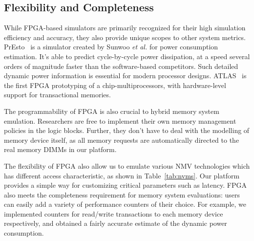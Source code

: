 \documentclass[conference]{IEEEtran}
\begin{document}
\subsection{Flexibility and Completeness}
While FPGA-based simulators are primarily recognized for their high
simulation efficiency and accuracy, they also provide unique scopes to
other system metrics.  PrEsto~\cite{Sunwoo:PrEsto} is a simulator
created by Sunwoo \emph{et al.} for power consumption estimation. It's
able to predict cycle-by-cycle power dissipation, at a speed several
orders of magnitude faster than the software-based competitors. Such
detailed dynamic power information is essential for modern processor
designs.  ATLAS~\cite{Njoroge:ATLAS} is the first FPGA prototyping of
a chip-multiprocessors, with hardware-level support for transactional
memories.

The programmability of FPGA is also crucial to hybrid memory system
emulation. Researchers are free to implement their own memory
management policies in the logic blocks. Further, they don't have to
deal with the modelling of memory device itself, as all memory
requests are automatically directed to the real memory DIMMs in our
platform.

The flexibility of FPGA also allow us to emulate various NMV
technologies which has different access characteristic, as shown in
Table~\ref{tab:nvms}. Our platform provides a simple way for
customizing critical parameters such as latency.  FPGA also meets the
completeness requirement for memory system evaluations: users can
easily add a variety of performance counters of their choice. For
example, we implemented counters for read/write transactions to each
memory device respectively, and obtained a fairly accurate estimate of
the dynamic power consumption.
\end{document}
